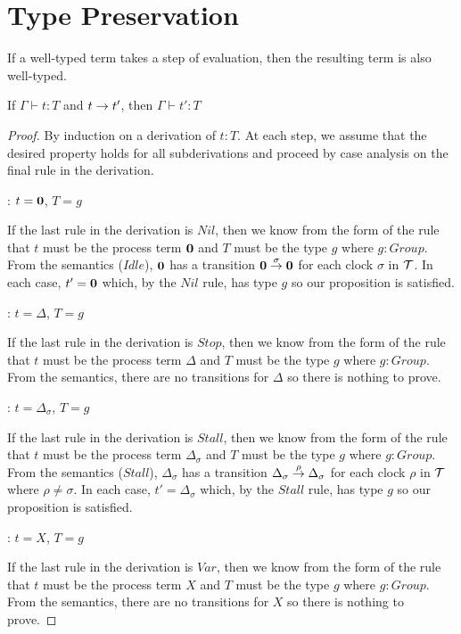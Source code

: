 \chapter{Type Preservation}

If a well-typed term takes a step of evaluation, then the resulting
term is also well-typed.

\begin{proposition}
If $\Gamma \vdash t : T$ and $t \stackrel{}{\rightarrow} t'$, then $\Gamma \vdash t' : T$
\end{proposition}

\begin{proof}
By induction on a derivation of $t:T$.  At each step, we assume that
the desired property holds for all subderivations and proceed by case
analysis on the final rule in the derivation.

: $t = \textbf{0}$, $T = g$

\noindent If the last rule in the derivation is $Nil$, then we know
from the form of the rule that $t$ must be the process term $\textbf{0}$ and
$T$ must be the type $g$ where $g : Group$.  From the semantics
($Idle$), $\textbf{0}$ has a transition $\textbf{0} \stackrel{\sigma}{\rightarrow} \textbf{0}$ for
each clock $\sigma$ in $\text{$\mathcal{T}$}$.  In each case, $t' = \textbf{0}$ which, by
the $Nil$ rule, has type $g$ so our proposition is satisfied.

: $t = \Delta$, $T = g$

\noindent If the last rule in the derivation is $Stop$, then we know
from the form of the rule that $t$ must be the process term $\Delta$
and $T$ must be the type $g$ where $g : Group$.  From the semantics,
there are no transitions for $\Delta$ so there is nothing to prove.

: $t = \Delta_\sigma$, $T = g$

\noindent If the last rule in the derivation is $Stall$, then we know
from the form of the rule that $t$ must be the process term
$\Delta_\sigma$ and $T$ must be the type $g$ where $g : Group$.  From
the semantics ($Stall$), $\Delta_\sigma$ has a transition
$\Delta_\sigma \stackrel{\rho}{\rightarrow} \Delta_\sigma$ for each clock $\rho$ in
$\text{$\mathcal{T}$}$ where $\rho \ne \sigma$.  In each case, $t' = \Delta_\sigma$
which, by the $Stall$ rule, has type $g$ so our proposition is
satisfied.

: $t = X$, $T = g$

\noindent If the last rule in the derivation is $Var$, then we know
from the form of the rule that $t$ must be the process term $X$ and
$T$ must be the type $g$ where $g : Group$.  From the semantics, there
are no transitions for $X$ so there is nothing to prove.


\end{proof}
